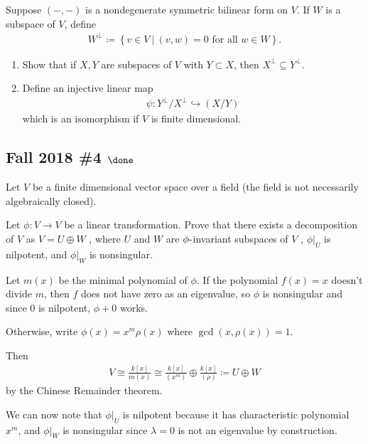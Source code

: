 Suppose \(({-}, {-})\) is a nondegenerate symmetric bilinear form on
\(V\). If \(W\) is a subspace of \(V\), define
\begin{align*}
W^{\perp} \coloneqq\left\{{v\in V {~\mathrel{\Big|}~}(v, w) = 0 \text{ for all } w\in W}\right\}
.\end{align*}

\begin{enumerate}
\def\labelenumi{\alph{enumi}.}
\item
  Show that if \(X, Y\) are subspaces of \(V\) with \(Y\subset X\), then
  \(X^{\perp} \subseteq Y^{\perp}\).
\item
  Define an injective linear map
  \begin{align*}
  \psi: Y^{\perp}/X^{\perp} \hookrightarrow(X/Y) {}^{ \check{} }
  \end{align*}
  which is an isomorphism if \(V\) is finite dimensional.
\end{enumerate}

\hypertarget{fall-2018-4-done}{%
\subsection{\texorpdfstring{Fall 2018 \#4
\(\done\)}{Fall 2018 \#4 \textbackslash done}}\label{fall-2018-4-done}}

Let \(V\) be a finite dimensional vector space over a field (the field
is not necessarily algebraically closed).

Let \(\phi : V \to V\) be a linear transformation. Prove that there
exists a decomposition of \(V\) as \(V = U \oplus W\) , where \(U\) and
\(W\) are \(\phi{\hbox{-}}\)invariant subspaces of \(V\) ,
\({\left.{{\phi}} \right|_{{U}} }\) is nilpotent, and
\({\left.{{\phi}} \right|_{{W}} }\) is nonsingular.


\begin{solution}

Let \(m(x)\) be the minimal polynomial of \(\phi\). If the polynomial
\(f(x) = x\) doesn't divide \(m\), then \(f\) does not have zero as an
eigenvalue, so \(\phi\) is nonsingular and since \(0\) is nilpotent,
\(\phi + 0\) works.

Otherwise, write \(\phi(x) = x^m \rho(x)\) where
\(\gcd(x, \rho(x)) = 1\).

Then
\begin{align*}
V \cong \frac{k[x]}{m(x)} \cong \frac{k[x]}{(x^m)} \oplus \frac{k[x]}{(\rho)}
\coloneqq U \oplus W
\end{align*}
by the Chinese Remainder theorem.

We can now note that \({\left.{{\phi}} \right|_{{U}} }\) is nilpotent
because it has characteristic polynomial \(x^m\), and
\({\left.{{\phi}} \right|_{{W}} }\) is nonsingular since \(\lambda = 0\)
is not an eigenvalue by construction.

\end{solution}

